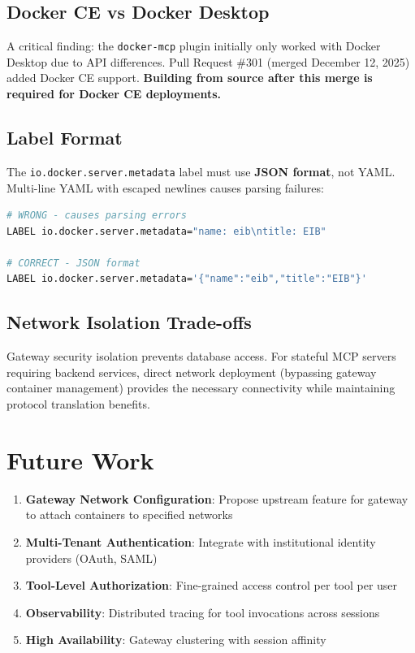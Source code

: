 \documentclass[11pt,letterpaper]{article}
\begin{document}
\subsection{Docker CE vs Docker Desktop}

A critical finding: the \texttt{docker-mcp} plugin initially only worked with Docker Desktop due to API differences. Pull Request \#301 (merged December 12, 2025) added Docker CE support. \textbf{Building from source after this merge is required for Docker CE deployments.}

\subsection{Label Format}

The \texttt{io.docker.server.metadata} label must use \textbf{JSON format}, not YAML. Multi-line YAML with escaped newlines causes parsing failures:

\begin{lstlisting}[language=bash,caption={Label Format Comparison}]
# WRONG - causes parsing errors
LABEL io.docker.server.metadata="name: eib\ntitle: EIB"

# CORRECT - JSON format
LABEL io.docker.server.metadata='{"name":"eib","title":"EIB"}'
\end{lstlisting}

\subsection{Network Isolation Trade-offs}

Gateway security isolation prevents database access. For stateful MCP servers requiring backend services, direct network deployment (bypassing gateway container management) provides the necessary connectivity while maintaining protocol translation benefits.

\section{Future Work}

\begin{enumerate}[noitemsep]
    \item \textbf{Gateway Network Configuration}: Propose upstream feature for gateway to attach containers to specified networks
    \item \textbf{Multi-Tenant Authentication}: Integrate with institutional identity providers (OAuth, SAML)
    \item \textbf{Tool-Level Authorization}: Fine-grained access control per tool per user
    \item \textbf{Observability}: Distributed tracing for tool invocations across sessions
    \item \textbf{High Availability}: Gateway clustering with session affinity
\end{enumerate}
\end{document}
